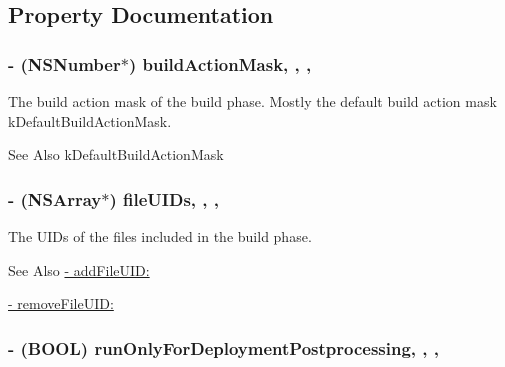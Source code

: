 \subsection{Property Documentation}
\hypertarget{interface_f_f_x_c_build_phase_ac85da98724c7e8bd08ebd98c4e3272b8}{
\subsubsection[{build\-Action\-Mask}]{\setlength{\rightskip}{0pt plus 5cm}-\/ (N\-S\-Number$\ast$) build\-Action\-Mask\hspace{0.3cm}{\ttfamily [read]}, {\ttfamily [write]}, {\ttfamily [nonatomic]}, {\ttfamily [strong]}}}\label{interface_f_f_x_c_build_phase_ac85da98724c7e8bd08ebd98c4e3272b8}
The build action mask of the build phase. Mostly the default build action mask k\-Default\-Build\-Action\-Mask. \begin{DoxySeeAlso}{See Also}
k\-Default\-Build\-Action\-Mask 
\end{DoxySeeAlso}
\hypertarget{interface_f_f_x_c_build_phase_a82969b0ed97364d87834f332419cd2b9}{
\subsubsection[{file\-U\-I\-Ds}]{\setlength{\rightskip}{0pt plus 5cm}-\/ (N\-S\-Array$\ast$) file\-U\-I\-Ds\hspace{0.3cm}{\ttfamily [read]}, {\ttfamily [write]}, {\ttfamily [nonatomic]}, {\ttfamily [strong]}}}\label{interface_f_f_x_c_build_phase_a82969b0ed97364d87834f332419cd2b9}
The U\-I\-Ds of the files included in the build phase. \begin{DoxySeeAlso}{See Also}
\hyperlink{interface_f_f_x_c_build_phase_a279a461fc0b088993ed492c6747d1c17}{-\/ add\-File\-U\-I\-D\-:} 

\hyperlink{interface_f_f_x_c_build_phase_a4142ccda1cc2d584e530e0e02c808354}{-\/ remove\-File\-U\-I\-D\-:} 
\end{DoxySeeAlso}
\hypertarget{interface_f_f_x_c_build_phase_aaa07d7e555511a6bfd68c7a9998e0334}{
\subsubsection[{run\-Only\-For\-Deployment\-Postprocessing}]{\setlength{\rightskip}{0pt plus 5cm}-\/ (B\-O\-O\-L) run\-Only\-For\-Deployment\-Postprocessing\hspace{0.3cm}{\ttfamily [read]}, {\ttfamily [write]}, {\ttfamily [nonatomic]}, {\ttfamily [assign]}}}\label{interface_f_f_x_c_build_phase_aaa07d7e555511a6bfd68c7a9998e0334}
